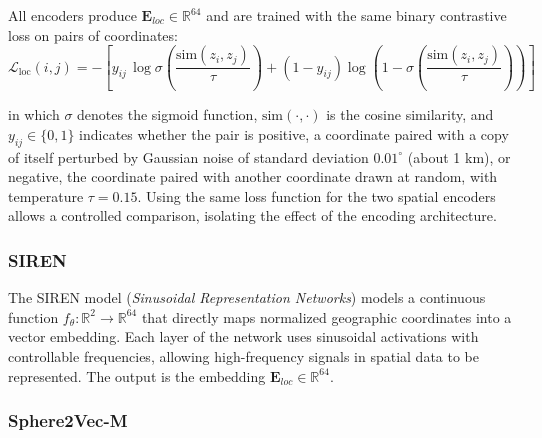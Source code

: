 All encoders produce $\mathbf{E}_{loc} \in \mathbb{R}^{64}$ and are
trained with the same binary contrastive loss on pairs of coordinates:
\begin{equation}
\mathcal{L}_{\text{loc}}(i,j)
=
- \left[
y_{ij}\,\log \sigma\!\left(\frac{\text{sim}(z_i,z_j)}{\tau}\right)
+
(1-y_{ij})
\log \left(1 - \sigma\!\left(\frac{\text{sim}(z_i,z_j)}{\tau}\right)\right)
\right]
\end{equation}

in which $\sigma$ denotes the sigmoid function, $\text{sim}(\cdot,\cdot)$ is the cosine similarity, and $y_{ij} \in \{0,1\}$ indicates whether the pair is positive, a coordinate paired with a copy of itself perturbed by Gaussian noise of standard deviation $0.01^{\circ}$ (about 1 km), or negative, the coordinate paired with another coordinate drawn at random, with temperature $\tau = 0.15$. Using the same loss function for the two spatial encoders allows a controlled comparison, isolating the effect of the encoding architecture.

\subsubsection{SIREN}

The SIREN model (\textit{Sinusoidal Representation Networks}) \cite{russwurm2024geographiclocationencodingspherical} models a continuous function $f_\theta : \mathbb{R}^2 \rightarrow \mathbb{R}^{64}$ that directly maps normalized geographic coordinates into a vector embedding. Each layer of the network uses sinusoidal activations with controllable frequencies, allowing high-frequency signals in spatial data to be represented. The output is the embedding $\mathbf{E}_{loc} \in \mathbb{R}^{64}$.

\subsubsection{Sphere2Vec-M}

